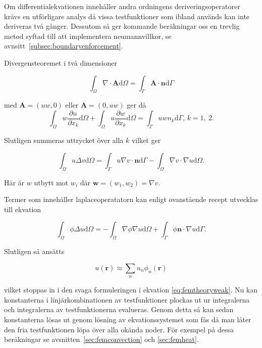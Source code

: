 Om differentialekvationen innehåller andra ordningens deriveringsoperatorer krävs en utförligare analys då vissa testfunktioner som ibland används kan inte deriveras
två gånger. Dessutom så ger kommande beräkningar oss en trevlig metod syftad
till att implementera neumannvillkor, se avnsitt~\ref{subsec:boundaryenforcement}.

Divergensteoremet i två dimensioner

\begin{equation}
\label{eq:femtheorygausstheorem}
\int_\Omega \nabla\cdot \mathbf{A} \mathrm{d}\Omega = \int_\Gamma \mathbf{A}\cdot\mathbf{n}
\mathrm{d}\Gamma
\end{equation}

med $\mathbf{A} = (uw, 0)$ eller $\mathbf{A} = (0, uw)$ ger då
\begin{equation}
\label{eq:femtheory:partint}
\int_\Omega w\frac{\partial u}{\partial x_k} \mathrm{d}\Omega +
\int_\Omega u\frac{\partial w}{\partial x_k} \mathrm{d}\Omega =
\int_\Gamma uwn_k \mathrm{d}\Gamma\mbox{,   }k=1,~2.
\end{equation}

Slutligen summeras uttrycket över alla
$k$ vilket ger

\begin{equation}
\label{eq:femtheory:green}
\int_\Omega u\Delta v \mathrm{d}\Omega =
\int_\Gamma u\nabla v\cdot\mathbf{n}\mathrm{d}\Gamma-\int_\Omega \nabla v\cdot\nabla u \mathrm{d}\Omega.
\end{equation}

Här är $w$ utbytt mot $w_i$ där $\mathbf{w} = (w_1, w_2) = \nabla v$.\cite{johnson2009}

Termer som innehåller laplaceoperatatorn kan enligt ovanstående recept utvecklas
till ekvation

\begin{equation}
\label{eq:femtheorylaplacerecepie}
\int_\Omega \phi\Delta u \mathrm{d}\Omega = -\int_\Omega \nabla\phi\nabla u \mathrm{d}\Omega +
\int_\Gamma \phi \mathbf{n}\cdot\nabla u \mathrm{d}\Gamma.
\end{equation} 

Slutligen så ansätts 

\begin{equation}
\label{eq:femtheoryansatz}
u(\mathbf{r}) \approx \sum_n u_n \phi_n(\mathbf{r})
\end{equation}

vilket stoppas
in i den svaga formuleringen i ekvation \eqref{eq:femtheoryweak}. Nu kan
konstanterna i linjärkombinationen av testfunktioner plockas ut ur integralerna
och integralerna av testfunktionerna evalueras. Genom detta så kan
sedan konstanterna lösas ut genom lösning av ekvationssystemet som
fås då man låter den fria testfunktionen löpa över alla okända noder.
För exempel på dessa beräkningar se avsnitten~\ref{sec:femconvection} och
\ref{sec:femheat}.


